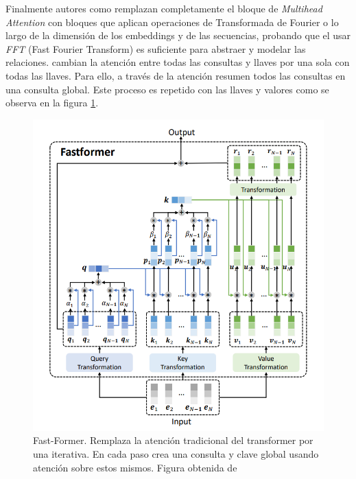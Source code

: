 Finalmente autores como \citeauthor{DBLP:journals/corr/abs-2105-03824} remplazan completamente
el bloque de \textit{Multihead Attention} con bloques que aplican operaciones de Transformada de
Fourier o lo largo de la dimensión de los  embeddings y de las secuencias, probando que el usar
\textit{FFT} (Fast Fourier Transform) es suficiente para abstraer y modelar las relaciones.
\citeauthor{DBLP:journals/corr/abs-2108-09084} cambian la atención entre todas las consultas
y llaves por una sola con todas las llaves. Para ello, a través de la atención resumen todos las
consultas en una consulta global. Este proceso es repetido con las llaves y valores como se observa
en la figura \ref{fig:fast-former}.

\begin{figure}[ht!]
    \centering
    \includegraphics[width=0.6 \textwidth]{Chapters/2. Transformer/Figures/transformer/fastformer.png}
    \caption{Fast-Former. Remplaza la atención tradicional del  transformer por una iterativa. En
             cada paso crea una consulta y clave global usando atención sobre estos mismos.
             Figura obtenida de \cite{DBLP:journals/corr/abs-2108-09084}}
    \label{fig:fast-former}
\end{figure}
